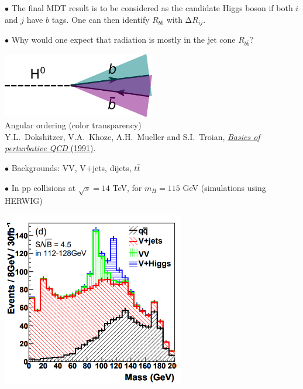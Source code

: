 \documentclass[9pt,a4paper,unknownkeysallowed,xcolor=dvipsnames,aspectratio=43]{beamer}
\begin{document}
\begin{frame}\vspace{2mm}

{\color{darkred}\Large$\bullet$} The final MDT result is to be considered as {\color{darkred}the candidate Higgs
boson} if both $i$ and $j$ have $b$ tags. One can then identify
$R_{b\bar{b}}$ with $∆R_{ij}$.
\vspace{2mm}

{\color{darkred}\Large$\bullet$} Why would one expect that radiation is mostly in the jet cone $R_{b
\bar{b}}$?\\\vspace{2mm}
\vspace{2mm}
\begin{center}
    \includegraphics[width=0.5\textwidth]{05/angularorder.png}\\\vspace{2mm}
   \color{darkred}Angular ordering (color transparency)\\ {\tiny 
    \color{teablue}Y.L.~Dokshitzer, V.A.~Khoze, A.H.~Mueller and S.I.~Troian, \href{https://www.lpthe.jussieu.fr/~yuri/BPQCD/BPQCD.pdf}{\emph{{Basics of
  perturbative QCD}} (1991)}.}
\end{center}\vspace{2mm}

{\color{darkred}\Large$\bullet$} Backgrounds: VV, V+jets, dijets, $t
\bar{t}$ 

\end{frame}
%
%
\begin{frame}\vspace{2mm}

{\color{darkred}\Large$\bullet$} In pp collisions at $\sqrt{s}=14$ TeV, for $m_H=115$ GeV (simulations using HERWIG) 
\vspace{2mm}
\begin{center}
\includegraphics[width=0.6\textwidth]{05/MDT.PNG}
\end{center}
\end{frame}
\end{document}
